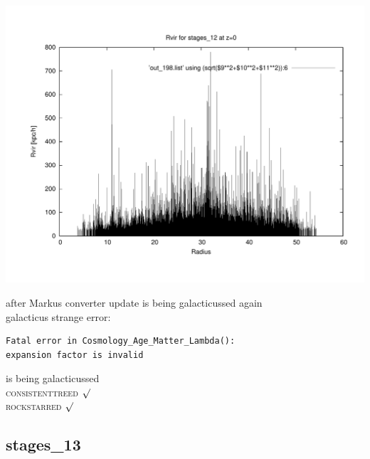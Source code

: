 \includegraphics[scale=0.3]{stages_12/plot_rvir_z0.pdf}

after Markus converter update 
is being galacticussed again \\
galacticus strange error: 
\begin{verbatim}
Fatal error in Cosmology_Age_Matter_Lambda():
expansion factor is invalid
\end{verbatim}
is being galacticussed \\
\textsc{consistenttreed} $\surd$ \\ 
\textsc{rockstarred} $\surd$

% 
%
%
%
%
%
%
%

\newpage
\subsection{stages\_13}

